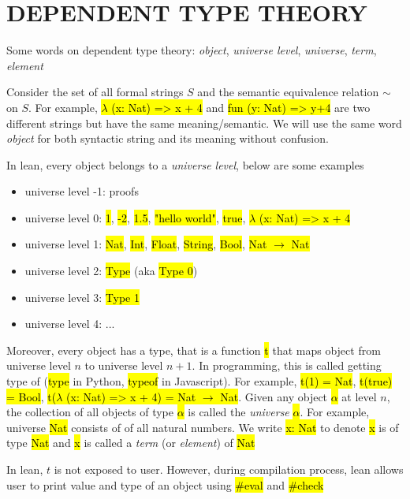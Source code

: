 \chapter{DEPENDENT TYPE THEORY}

Some words on dependent type theory: \textit{object}, \textit{universe level}, \textit{universe}, \textit{term}, \textit{element}

Consider the set of all formal strings $S$ and the semantic equivalence relation $\sim$ on $S$. For example, \hl{$\lambda$ (x: Nat) => x + 4} and \hl{fun (y: Nat) => y+4} are two different strings but have the same meaning/semantic. We will use the same word \textit{object} for both syntactic string and its meaning without confusion.

In lean, every object belongs to a \textit{universe level}, below are some examples

\begin{itemize}
	\item universe level -1: proofs
	\item universe level 0: \hl{1}, \hl{-2}, \hl{1.5}, \hl{"hello world"}, \hl{true}, \hl{$\lambda$ (x: Nat) => x + 4}
	\item universe level 1: \hl{Nat}, \hl{Int}, \hl{Float}, \hl{String}, \hl{Bool}, \hl{Nat $\to$ Nat}
	\item universe level 2: \hl{Type} (aka \hl{Type 0})
	\item universe level 3: \hl{Type 1}
	\item universe level 4: ...
\end{itemize}

Moreover, every object has a type, that is a function \hl{t} that maps object from universe level $n$ to universe level $n+1$. In programming, this is called getting type of (\hl{type} in Python, \hl{typeof} in Javascript). For example, \hl{t(1) = Nat}, \hl{t(true) = Bool}, \hl{t($\lambda$ (x: Nat) => x + 4) = Nat $\to$ Nat}. Given any object \hl{$\alpha$} at level $n$, the collection of all objects of type \hl{$\alpha$} is called the \textit{universe} \hl{$\alpha$}. For example, universe \hl{Nat} consists of of all natural numbers. We write \hl{x: Nat} to denote \hl{x} is of type \hl{Nat} and \hl{x} is called a \textit{term} (or \textit{element}) of \hl{Nat}

In lean, $t$ is not exposed to user. However, during compilation process, lean allows user to print value and type of an object using \hl{\#eval} and \hl{\#check}






